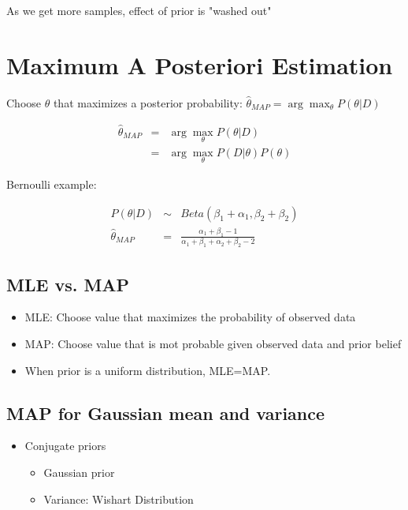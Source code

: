 \documentclass[letterpaper,10pt]{article}
\begin{document}
As we get more samples, effect of prior is "washed out"

\section{Maximum A Posteriori Estimation}

Choose $\theta$ that maximizes a posterior probability:
$\hat{\theta}_{MAP}=\arg\max_\theta{P(\theta|D)}$

\begin{equation}
\begin{array}{rcl}
\hat{\theta}_{MAP} & = & \arg\max_\theta{P(\theta|D)} \\
				   & = & \arg\max_\theta{P(D|\theta)P(\theta)}
\end{array}
\end{equation}

Bernoulli example:

\begin{equation}
\begin{array}{rcl}
P(\theta|D) & \sim & Beta(\beta_1+\alpha_1,\beta_2+\beta_2) \\
\hat{\theta}_{MAP} & = & \frac{\alpha_1+\beta_1-1}{\alpha_1+\beta_1+\alpha_2+\beta_2-2}
\end{array}
\end{equation}

\subsection{MLE vs. MAP}

\begin{itemize}
	\item MLE: Choose value that maximizes the probability of observed data
	\item MAP: Choose value that is mot probable given observed data and prior belief
	\item When prior is a uniform distribution, MLE=MAP.
\end{itemize}

\subsection{MAP for Gaussian mean and variance}

\begin{itemize}
	\item Conjugate priors
	\begin{itemize}
		\item Gaussian prior
		\item Variance: Wishart Distribution
	\end{itemize}
\end{itemize}
\end{document}
